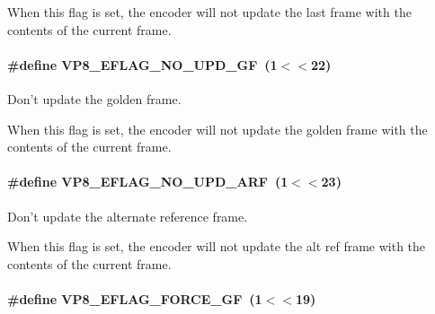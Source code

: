 \-When this flag is set, the encoder will not update the last frame with the contents of the current frame. \hypertarget{group__vp8__encoder_gab01d066c5236457d345ce1cab4c41d6b}{
\paragraph[{\-V\-P8\-\_\-\-E\-F\-L\-A\-G\-\_\-\-N\-O\-\_\-\-U\-P\-D\-\_\-\-G\-F}]{\setlength{\rightskip}{0pt plus 5cm}\#define \-V\-P8\-\_\-\-E\-F\-L\-A\-G\-\_\-\-N\-O\-\_\-\-U\-P\-D\-\_\-\-G\-F~(1$<$$<$22)}}
\label{group__vp8__encoder_gab01d066c5236457d345ce1cab4c41d6b}


\-Don't update the golden frame. 

\-When this flag is set, the encoder will not update the golden frame with the contents of the current frame. \hypertarget{group__vp8__encoder_ga1cff46a5287e73a620660030d40b9e6c}{
\paragraph[{\-V\-P8\-\_\-\-E\-F\-L\-A\-G\-\_\-\-N\-O\-\_\-\-U\-P\-D\-\_\-\-A\-R\-F}]{\setlength{\rightskip}{0pt plus 5cm}\#define \-V\-P8\-\_\-\-E\-F\-L\-A\-G\-\_\-\-N\-O\-\_\-\-U\-P\-D\-\_\-\-A\-R\-F~(1$<$$<$23)}}
\label{group__vp8__encoder_ga1cff46a5287e73a620660030d40b9e6c}


\-Don't update the alternate reference frame. 

\-When this flag is set, the encoder will not update the alt ref frame with the contents of the current frame. \hypertarget{group__vp8__encoder_gacb64c00adcb361f72a9a3028eb12f5ff}{
\paragraph[{\-V\-P8\-\_\-\-E\-F\-L\-A\-G\-\_\-\-F\-O\-R\-C\-E\-\_\-\-G\-F}]{\setlength{\rightskip}{0pt plus 5cm}\#define \-V\-P8\-\_\-\-E\-F\-L\-A\-G\-\_\-\-F\-O\-R\-C\-E\-\_\-\-G\-F~(1$<$$<$19)}}
\label{group__vp8__encoder_gacb64c00adcb361f72a9a3028eb12f5ff}


